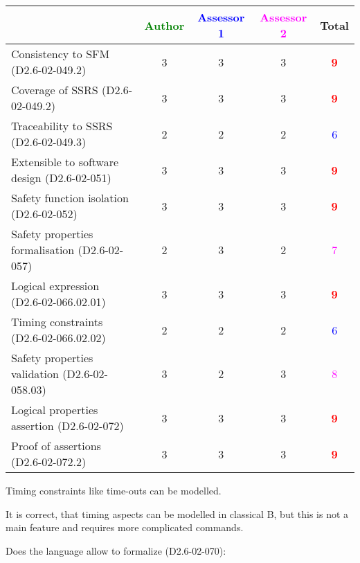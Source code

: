\begin{tabular}{|l | c | c | c | c|}
\hline
& \textcolor{green}{Author} & \textcolor{blue}{Assessor 1} & \textcolor{magenta}{Assessor 2} & Total \\
\hline 
Consistency to SFM (D2.6-02-049.2) & 3     & 3     & 3     & \textcolor{red}{\textbf{9}} \\
\hline
Coverage of SSRS (D2.6-02-049.2)  & 3     & 3     & 3     & \textcolor{red}{\textbf{9}} \\
\hline
Traceability to  SSRS (D2.6-02-049.3)  & 2     & 2     & 2     & \textcolor{blue}{6} \\
\hline
Extensible to software design (D2.6-02-051)  & 3     & 3     & 3     & \textcolor{red}{\textbf{9}} \\
\hline
Safety function isolation (D2.6-02-052)  & 3     & 3     & 3     & \textcolor{red}{\textbf{9}} \\
\hline 
Safety properties formalisation (D2.6-02-057)  & 2     & 3     & 2     & \textcolor{magenta}{7} \\
\hline
Logical expression (D2.6-02-066.02.01)  & 3     & 3     & 3     & \textcolor{red}{\textbf{9}} \\
\hline
Timing constraints (D2.6-02-066.02.02)  & 2     & 2     & 2     & \textcolor{blue}{6} \\
\hline
Safety properties validation (D2.6-02-058.03)  & 3     & 2     & 3     & \textcolor{magenta}{8} \\
\hline
Logical properties assertion (D2.6-02-072)  & 3     & 3     & 3     & \textcolor{red}{\textbf{9}} \\
\hline
Proof of assertions (D2.6-02-072.2)  & 3     & 3     & 3     & \textcolor{red}{\textbf{9}} \\
\hline
\end{tabular}



\begin{author_comment}
Timing constraints like time-outs can be modelled.
\end{author_comment}


\begin{assessor2}
It is correct, that timing aspects can be modelled in classical B, but this is not a main feature and requires more complicated commands.
\end{assessor2}

Does the language allow to  formalize (D2.6-02-070):

